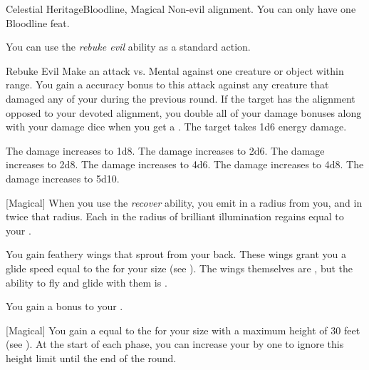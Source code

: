     \begin{feat}{Celestial Heritage}{Bloodline, Magical}
        \featpre Non-evil alignment.
         You can only have one Bloodline feat.

         You can use the \textit{rebuke evil} ability as a standard action.
        \begin{instantability}{Rebuke Evil}
            \rankline
            Make an attack vs. Mental against one creature or object within \rngmed range.
            You gain a  accuracy bonus to this attack against any creature that damaged any of your  during the previous round.
            If the target has the alignment opposed to your devoted alignment, you double all of your damage bonuses along with your damage dice when you get a .
            \hit The target takes 1d6 \add {} energy damage.

            \rankline
             The damage increases to 1d8.
             The damage increases to 2d6.
             The damage increases to 2d8.
             The damage increases to 4d6.
             The damage increases to 4d8.
             The damage increases to 5d10.
        \end{instantability}

        [Magical] When you use the \textit{recover} ability, you  emit  in a \medarea radius from you, and  in twice that radius.
        Each  in the radius of brilliant illumination regains  equal to your .

         You gain feathery wings that sprout from your back.
        These wings grant you a glide speed equal to the  for your size (see ).
        The wings themselves are , but the ability to fly and glide with them is .

         You gain a  bonus to your .

        [Magical] You gain a  equal to the  for your size with a maximum height of 30 feet (see ).
        At the start of each phase, you can increase your  by one to ignore this height limit until the end of the round.


\end{feat}
